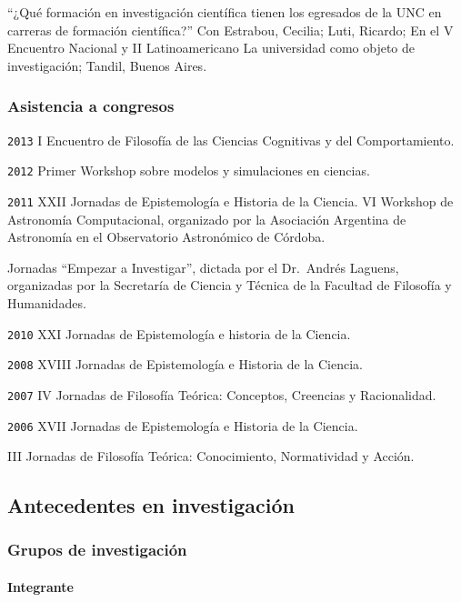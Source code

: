 \documentclass[]{article}
\let\oldparagraph\paragraph
\renewcommand{\paragraph}[1]{\oldparagraph{#1}\mbox{}}
\begin{document}
``¿Qué formación en investigación científica tienen los egresados de la
UNC en carreras de formación científica?'' Con Estrabou, Cecilia; Luti,
Ricardo; En el V Encuentro Nacional y II Latinoamericano La universidad
como objeto de investigación; Tandil, Buenos Aires.

\hypertarget{asistencia-a-congresos}{%
\subsubsection{Asistencia a congresos}\label{asistencia-a-congresos}}

\texttt{2013} I Encuentro de Filosofía de las Ciencias Cognitivas y del
Comportamiento.

\texttt{2012} Primer Workshop sobre modelos y simulaciones en ciencias.

\texttt{2011} XXII Jornadas de Epistemología e Historia de la Ciencia.
VI Workshop de Astronomía Computacional, organizado por la Asociación
Argentina de Astronomía en el Observatorio Astronómico de Córdoba.

Jornadas ``Empezar a Investigar'', dictada por el Dr.~Andrés Laguens,
organizadas por la Secretaría de Ciencia y Técnica de la Facultad de
Filosofía y Humanidades.

\texttt{2010} XXI Jornadas de Epistemología e historia de la Ciencia.

\texttt{2008} XVIII Jornadas de Epistemología e Historia de la Ciencia.

\texttt{2007} IV Jornadas de Filosofía Teórica: Conceptos, Creencias y
Racionalidad.

\texttt{2006} XVII Jornadas de Epistemología e Historia de la Ciencia.

III Jornadas de Filosofía Teórica: Conocimiento, Normatividad y Acción.

\hypertarget{antecedentes-en-investigaciuxf3n}{%
\subsection{Antecedentes en
investigación}\label{antecedentes-en-investigaciuxf3n}}

\hypertarget{grupos-de-investigaciuxf3n}{%
\subsubsection{Grupos de
investigación}\label{grupos-de-investigaciuxf3n}}

\hypertarget{integrante}{%
\paragraph{Integrante}\label{integrante}}
\end{document}

